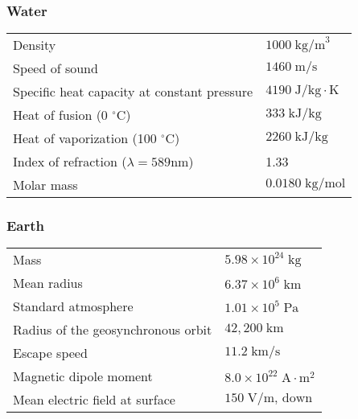 \documentclass[../PhysicsFormulae.tex]{subfiles}
\begin{document}
\subsubsection{Water}
\begin{tabular}{l l}
    Density & $1000 \; \textrm{kg/m}^3$\\
    Speed of sound & $1460 \; \textrm{m/s}$\\
    Specific heat capacity at constant pressure & $4190 \; \textrm{J/kg} \cdot \textrm{K}$\\
    Heat of fusion (0 $^{\circ}$C) & $333 \; \textrm{kJ/kg}$\\
    Heat of vaporization (100 $^{\circ}$C) & $2260 \; \textrm{kJ/kg}$\\
    Index of refraction ($\lambda = 589 \textrm{nm}$) & 1.33\\
    Molar mass & $0.0180 \; \textrm{kg/mol}$
\end{tabular}

\subsubsection{Earth}
\begin{tabular}{l l}
    Mass & $5.98 \times 10^{24} \; \textrm{kg}$\\
    Mean radius & $6.37 \times 10^6 \; \textrm{km}$\\
    Standard atmosphere & $1.01 \times 10^5 \; \textrm{Pa}$\\
    Radius of the geosynchronous orbit & $42,200 \; \textrm{km}$\\
    Escape speed & $11.2 \; \textrm{km/s}$\\
    Magnetic dipole moment & $8.0 \times 10^{22} \; \textrm{A} \cdot \textrm{m}^2$\\
    Mean electric field at surface & $150 \; \textrm{V/m, down}$
\end{tabular}
\end{document}
